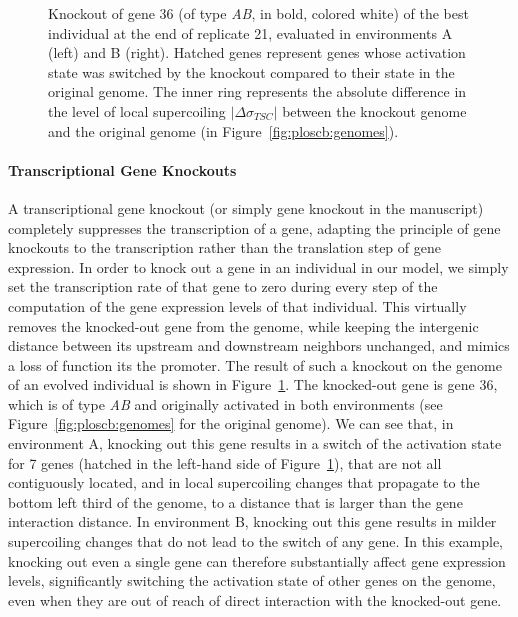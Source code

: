 \begin{figure}[H]
  \centering
  \begin{elasticrow}[width=\linewidth]
	\end{elasticrow}
  \caption[Example evolved individual with a knocked-out gene, evaluated in both environments]{Knockout of gene 36 (of type \emph{AB}, in bold, colored white) of the best individual at the end of replicate 21, evaluated in environments A (left) and B (right).
  Hatched genes represent genes whose activation state was switched by the knockout compared to their state in the original genome.
  The inner ring represents the absolute difference in the level of local supercoiling $|\Delta\sigma_{TSC}|$ between the knockout genome and the original genome (in Figure~\ref{fig:ploscb:genomes}).}
  \label{fig:ploscb:ko_genomes}
\end{figure}

\paragraph{Transcriptional Gene Knockouts}
A transcriptional gene knockout (or simply gene knockout in the manuscript) completely suppresses the transcription of a gene, adapting the principle of gene knockouts to the transcription rather than the translation step of gene expression.
In order to knock out a gene in an individual in our model, we simply set the transcription rate of that gene to zero during every step of the computation of the gene expression levels of that individual.
This virtually removes the knocked-out gene from the genome, while keeping the intergenic distance between its upstream and downstream neighbors unchanged, and mimics a loss of function its the promoter.
The result of such a knockout on the genome of an evolved individual is shown in Figure~\ref{fig:ploscb:ko_genomes}.
The knocked-out gene is gene 36, which is of type \emph{AB} and originally activated in both environments (see Figure~\ref{fig:ploscb:genomes} for the original genome).
We can see that, in environment A, knocking out this gene results in a switch of the activation state for 7 genes (hatched in the left-hand side of Figure~\ref{fig:ploscb:ko_genomes}), that are not all contiguously located, and in local supercoiling changes that propagate to the bottom left third of the genome, to a distance that is larger than the gene interaction distance.
In environment B, knocking out this gene results in milder supercoiling changes that do not lead to the switch of any gene.
In this example, knocking out even a single gene can therefore substantially affect gene expression levels, significantly switching the activation state of other genes on the genome, even when they are out of reach of direct interaction with the knocked-out gene.

